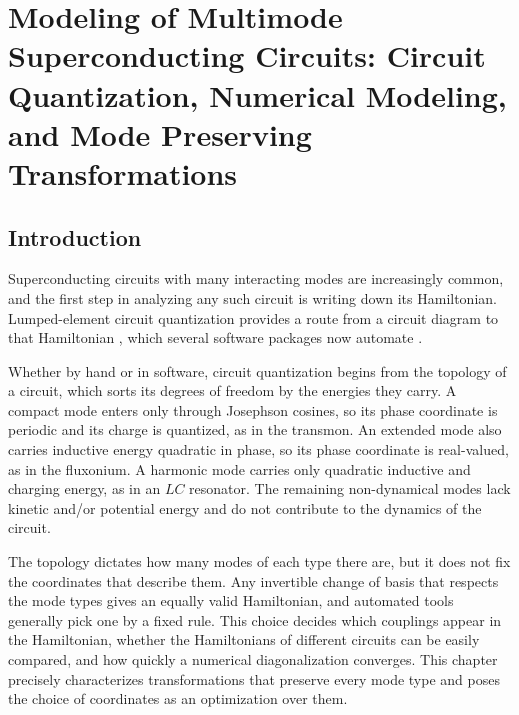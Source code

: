 
\chapter{Modeling of Multimode Superconducting Circuits: Circuit Quantization, Numerical Modeling, and Mode Preserving Transformations}\label{chp:circuit_quantization}



\section{Introduction}
Superconducting circuits with many interacting modes are increasingly common, and the first step in analyzing any such circuit is writing down its Hamiltonian.
Lumped-element circuit quantization provides a route from a circuit diagram to that Hamiltonian \cite{BurkardKochDiVincenzo2004,voolIntroductionQuantumElectromagnetic2017}, which several software packages now automate \cite{groszkowskiScqubitsPythonPackage2021a,chittaComputeraidedQuantizationNumerical2022a,rajabzadehAnalysisArbitrarySuperconducting2023,aumannCircuitQOpensourceToolbox2022,gelyQuCATQuantumCircuit2020}.

Whether by hand or in software, circuit quantization begins from the topology of a circuit, which sorts its degrees of freedom by the energies they carry.
A compact mode enters only through Josephson cosines, so its phase coordinate is periodic and its charge is quantized, as in the transmon.
An extended mode also carries inductive energy quadratic in phase, so its phase coordinate is real-valued, as in the fluxonium.
A harmonic mode carries only quadratic inductive and charging energy, as in an $LC$ resonator.
The remaining non-dynamical modes lack kinetic and/or potential energy and do not contribute to the dynamics of the circuit.

The topology dictates how many modes of each type there are, but it does not fix the coordinates that describe them.
Any invertible change of basis that respects the mode types gives an equally valid Hamiltonian, and automated tools generally pick one by a fixed rule.
This choice decides which couplings appear in the Hamiltonian, whether the Hamiltonians of different circuits can be easily compared, and how quickly a numerical diagonalization converges.
This chapter precisely characterizes transformations that preserve every mode type and poses the choice of coordinates as an optimization over them.

